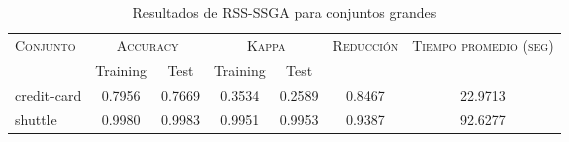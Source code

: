 \begin{table}[]
\centering
\begin{tabular}{l c c c c c c}
\hline
\multirow{2}{*}{\textsc{Conjunto}}
	& \multicolumn{2}{c}{\textsc{Accuracy}}
	& \multicolumn{2}{c}{\textsc{Kappa}}
	& \textsc{Reducción}
	& \textsc{Tiempo promedio (seg)} \\
	& Training & Test
	& Training & Test \\ 
\hline
\hline

credit-card & 0.7956 & 0.7669 & 0.3534 & 0.2589 & 0.8467 & 22.9713 \\
shuttle & 0.9980 & 0.9983 & 0.9951 & 0.9953 & 0.9387 & 92.6277 \\

\hline
\end{tabular}
\caption{Resultados de RSS-SSGA para conjuntos grandes }
\label{res-grande-RSS-ssga}
\end{table}

